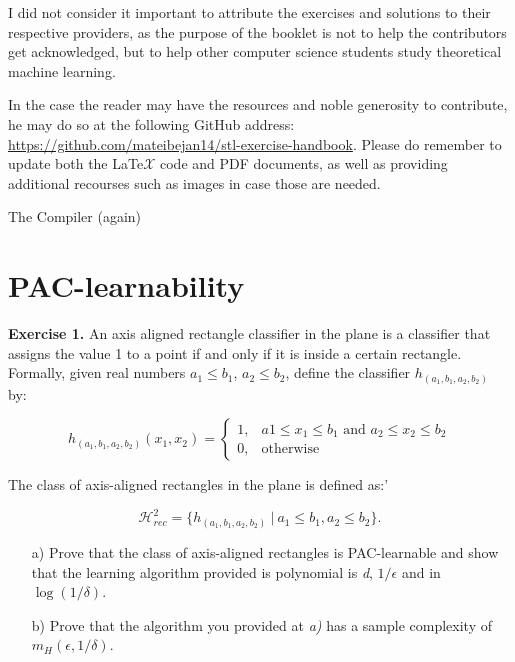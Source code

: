 \documentclass{article}
\newcommand{\<}{\langle}
\renewcommand{\>}{\rangle}
\theoremstyle{definition}
\begin{document}
I did not consider it important to attribute the exercises and solutions to their respective providers, as the purpose of the booklet is not to help the contributors get acknowledged, but to help other computer science students study theoretical machine learning.

In the case the reader may have the resources and noble generosity to contribute, he may do so at the following GitHub address: \url{https://github.com/mateibejan14/stl-exercise-handbook}. Please do remember to update both the LaTe$\mathcal{X}$ code and PDF documents, as well as providing additional recourses such as images in case those are needed.

\hspace{8cm} The Compiler (again)

\newpage

\tableofcontents

\newpage

\section{PAC-learnability}

\textbf{Exercise 1.} An axis aligned rectangle classifier in the plane
is a classifier that assigns the value 1 to a point if and only if it is inside a certain rectangle. Formally, given real numbers $a_1 \leq b_1$, $a_2 \leq b_2$, define the classifier $h_{(a_1, b_1, a_2, b_2)}$ by:

$$h_{(a_1, b_1, a_2, b_2)}(x_1, x_2) = 
     \begin{cases}
       1, & a1 \leq x_1 \leq b_1 \text{ and } a_2 \leq x_2 \leq b_2 \\
       0, &\text{otherwise}
     \end{cases}$$

The class of axis-aligned rectangles in the plane is defined as:'

$$\mathcal{H}^2_{rec} = \{h_{(a_1, b_1, a_2, b_2)} \ | \ a_1 \leq b_1, a_2 \leq b_2\}.$$

\begin{itemize}
    \item[a)] Prove that the class of axis-aligned rectangles is PAC-learnable and show that the learning algorithm provided is polynomial is \textit{d}, $1/\epsilon$ and in $\log(1/\delta)$.
    \item[b)] Prove that the algorithm you provided at \textit{a)} has a sample complexity of $m_H(\epsilon, 1/\delta)$.
\end{itemize}
\end{document}
